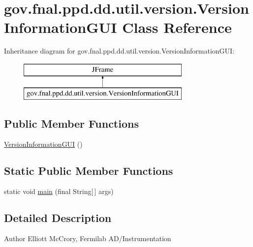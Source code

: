 \hypertarget{classgov_1_1fnal_1_1ppd_1_1dd_1_1util_1_1version_1_1VersionInformationGUI}{\section{gov.\-fnal.\-ppd.\-dd.\-util.\-version.\-Version\-Information\-G\-U\-I Class Reference}
\label{classgov_1_1fnal_1_1ppd_1_1dd_1_1util_1_1version_1_1VersionInformationGUI}
}
Inheritance diagram for gov.\-fnal.\-ppd.\-dd.\-util.\-version.\-Version\-Information\-G\-U\-I\-:\begin{figure}[H]
\begin{center}
\leavevmode
\includegraphics[height=2.000000cm]{classgov_1_1fnal_1_1ppd_1_1dd_1_1util_1_1version_1_1VersionInformationGUI}
\end{center}
\end{figure}
\subsection*{Public Member Functions}
\begin{DoxyCompactItemize}
\item 
\hyperlink{classgov_1_1fnal_1_1ppd_1_1dd_1_1util_1_1version_1_1VersionInformationGUI_a49d0ce270ef75b71e3ca79fed63d2c28}{Version\-Information\-G\-U\-I} ()
\end{DoxyCompactItemize}
\subsection*{Static Public Member Functions}
\begin{DoxyCompactItemize}
\item 
static void \hyperlink{classgov_1_1fnal_1_1ppd_1_1dd_1_1util_1_1version_1_1VersionInformationGUI_af31ef0bbe7ac5b7acc1a2b0860714270}{main} (final String\mbox{[}$\,$\mbox{]} args)
\end{DoxyCompactItemize}


\subsection{Detailed Description}
\begin{DoxyAuthor}{Author}
Elliott Mc\-Crory, Fermilab A\-D/\-Instrumentation 
\end{DoxyAuthor}


